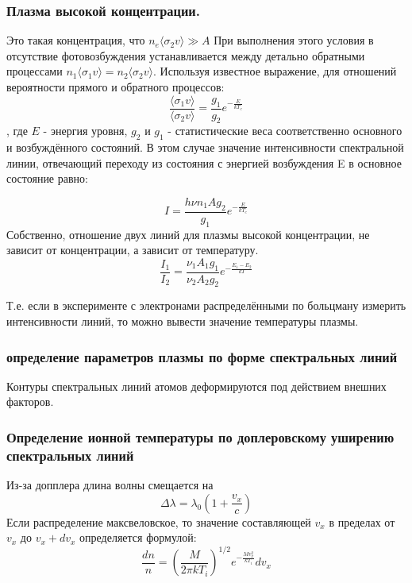 \documentclass[10pt, a4paper]{article}
\begin{document}
\subsubsection{Плазма высокой концентрации.}

Это такая концентрация, что $n_e \langle\sigma_2 v\rangle \gg A$ 
При выполнения этого условия в отсутствие фотовозбуждения устанавливается между детально обратными процессами $n_1 \langle\sigma_1 v\rangle = n_2 \langle\sigma_2 v\rangle$.
Используя известное выражение, для отношений вероятности прямого и обратного процессов:
\begin{equation}
	\frac{\langle\sigma_1 v\rangle}{\langle\sigma_2 v\rangle} = \frac{g_1}{g_2} e^{-\frac{E}{kT_e}}
\end{equation}
, где $E$ -  энергия уровня, $g_2$ и $g_1$  - статистические веса соответственно основного и возбуждённого состояний.
В этом случае значение интенсивности спектральной линии, отвечающий переходу из состояния с энергией возбуждения E в основное состояние равно:

\begin{equation}
	I=\frac{h \nu n_1 A g_2}{g_1} e^{-\frac{E}{kT_e}}
\end{equation}
Собственно, отношение двух линий для плазмы высокой концентрации, не зависит от концентрации, а зависит от температуру.
\begin{equation}
	\frac{I_1}{I_2}=\frac{ \nu_1 A_1 g_1}{ \nu_2 A_2 g_2} e^{-\frac{E_1 - E_2}{kT}}
\end{equation}

Т.е. если в эксперименте с электронами распределёнными по больцману измерить интенсивности линий, то можно вывести значение температуры плазмы. 

\subsubsection{определение параметров плазмы по форме спектральных линий}

Контуры спектральных линий атомов деформируются под действием внешних факторов.
\subsubsection{Определение ионной температуры по доплеровскому уширению спектральных линий}



Из-за допплера длина волны смещается на 
\begin{equation}
	\Delta \lambda = \lambda_0 \left(1+\frac{v_x}{c}\right)
\end{equation}
Если распределение максвеловское, то  значение составляющей $v_x$  в пределах от  $v_x$  до $v_x + dv_x$ определяется формулой:
\begin{equation}
	\frac{dn}{n}=\left(\frac{M}{2\pi kT_i}\right)^{1/2} e^{-\frac{Mv^{2}_x}{kT_i}} dv_x
\end{equation}
\end{document}
